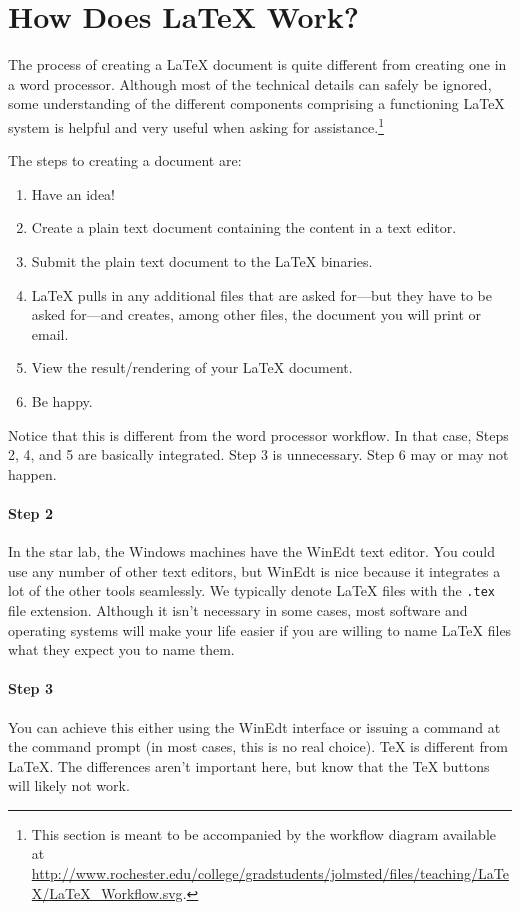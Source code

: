 \section{How Does \LaTeX{} Work?}

\par The process of creating a \LaTeX{} document is quite different
from creating one in a word processor. Although most of the technical
details can safely be ignored, some understanding of the different
components comprising a functioning \LaTeX{} system is helpful and
very useful when asking for assistance.\footnote{This section is meant
  to be accompanied by the workflow diagram available at
  \url{http://www.rochester.edu/college/gradstudents/jolmsted/files/teaching/LaTeX/LaTeX_Workflow.svg}.
}

The steps to creating a document are:
\begin{enumerate}
\item Have an idea!
\item Create a plain text document containing the content in a text
  editor.
\item Submit the plain text document to the \LaTeX{} binaries.
\item \LaTeX{} pulls in any additional files that are asked for---but
  they have to be asked for---and creates, among other files, the
  document you will print or email.
\item View the result/rendering of your \LaTeX{} document.
\item Be happy.
\end{enumerate}

Notice that this is different from the word processor workflow. In
that case, Steps 2, 4, and 5 are basically integrated. Step 3 is
unnecessary. Step 6 may or may not happen.

\paragraph{Step 2} In the star lab, the Windows machines have the WinEdt
text editor. You could use any number of other text editors, but
WinEdt is nice because it integrates a lot of the other tools
seamlessly. We typically denote \LaTeX{} files with the \texttt{.tex}
file extension. Although it isn't necessary in some cases, most
software and operating systems will make your life easier if you are
willing to name \LaTeX{} files what they expect you to name them.

\paragraph{Step 3} You can achieve this either using the WinEdt
interface or issuing a command at the command prompt (in most cases,
this is no real choice). \TeX{} is different from \LaTeX{}. The
differences aren't important here, but know that the \TeX{} buttons
will likely not work.

